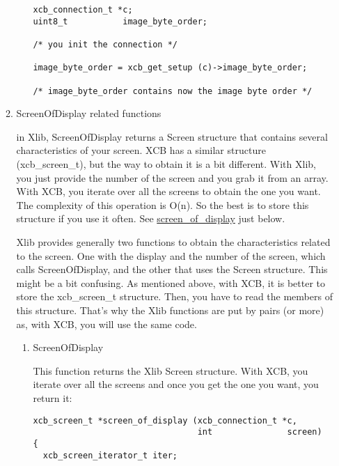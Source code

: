 \documentclass[12pt,oneside,titlepage]{book}
\begin{document}
\begin{enumerate}
\begin{enumerate}
\begin{enumerate}
\begin{verbatim}
xcb_connection_t *c;
uint8_t           image_byte_order;

/* you init the connection */

image_byte_order = xcb_get_setup (c)->image_byte_order;

/* image_byte_order contains now the image byte order */
\end{verbatim}
    \end{enumerate}
  \item
    \protect\hypertarget{screenofdisplay}{}{ScreenOfDisplay related
    functions}

    in Xlib, {ScreenOfDisplay} returns a {Screen} structure that
    contains several characteristics of your screen. XCB has a similar
    structure ({xcb\_screen\_t}), but the way to obtain it is a bit
    different. With Xlib, you just provide the number of the screen and
    you grab it from an array. With XCB, you iterate over all the
    screens to obtain the one you want. The complexity of this operation
    is O(n). So the best is to store this structure if you use it often.
    See \protect\hyperlink{ScreenOfDisplay}{screen\_of\_display} just
    below.

    Xlib provides generally two functions to obtain the characteristics
    related to the screen. One with the display and the number of the
    screen, which calls {ScreenOfDisplay}, and the other that uses the
    {Screen} structure. This might be a bit confusing. As mentioned
    above, with XCB, it is better to store the {xcb\_screen\_t}
    structure. Then, you have to read the members of this structure.
    That's why the Xlib functions are put by pairs (or more) as, with
    XCB, you will use the same code.

    \begin{enumerate}
    \item
      \protect\hypertarget{ScreenOfDisplay}{}{ScreenOfDisplay}

      This function returns the Xlib {Screen} structure. With XCB, you
      iterate over all the screens and once you get the one you want,
      you return it:

\begin{verbatim}
xcb_screen_t *screen_of_display (xcb_connection_t *c,
                                 int               screen)
{
  xcb_screen_iterator_t iter;


\end{verbatim}
\end{enumerate}
\end{enumerate}
\end{enumerate}
\end{document}
